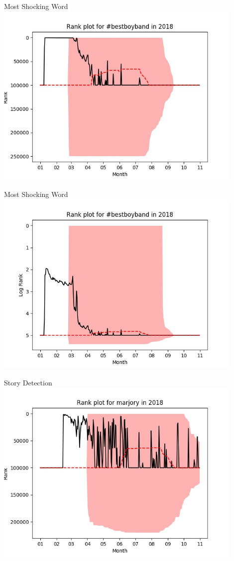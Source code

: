 \documentclass{beamer}
\begin{document}
\begin{frame}{Most Shocking Word}
    \includegraphics[width=0.9\textwidth]{bestboyband-2018.jpg}
\end{frame}

\begin{frame}{Most Shocking Word}
    \includegraphics[width=0.9\textwidth]{bestboyband-2018-LOG.jpg}
\end{frame}

\begin{frame}{Story Detection}
  \includegraphics[width=0.9\textwidth]{marjory-2018.jpg}
\end{frame}
\end{document}
